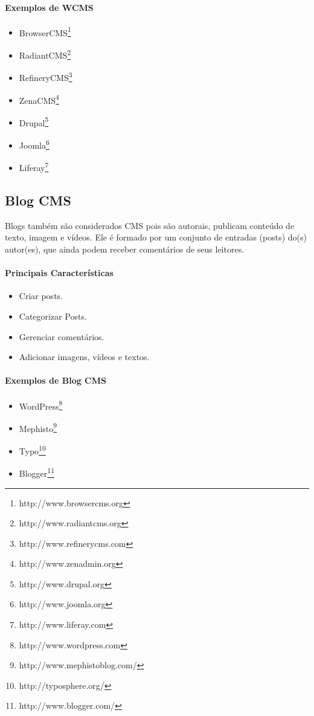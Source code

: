 \paragraph{Exemplos de WCMS} 

\begin{itemize}
  \item BrowserCMS\footnote{http://www.browsercms.org}
  \item RadiantCMS\footnote{http://www.radiantcms.org}
  \item RefineryCMS\footnote{http://www.refinerycms.com}
  \item ZenaCMS\footnote{http://www.zenadmin.org}
  \item Drupal\footnote{http://www.drupal.org}
  \item Joomla\footnote{http://www.joomla.org}
  \item Liferay\footnote{http://www.liferay.com}
\end{itemize}  


\subsection{Blog CMS} 

Blogs também são considerados CMS pois são autorais, publicam conteúdo de texto, imagem e vídeos. Ele é formado por um conjunto de entradas (posts) do(s) autor(es), que ainda podem receber comentários de seus leitores.

\paragraph{Principais Características}

\begin{itemize}
  \item Criar posts.
  \item Categorizar Posts.
  \item Gerenciar comentários.
  \item Adicionar imagens, vídeos e textos.
\end{itemize}

\paragraph{Exemplos de Blog CMS} 

\begin{itemize}
  \item WordPress\footnote{http://www.wordpress.com}
  \item Mephisto\footnote{http://www.mephistoblog.com/}
  \item Typo\footnote{http://typosphere.org/}
  \item Blogger\footnote{http://www.blogger.com/}
\end{itemize}

